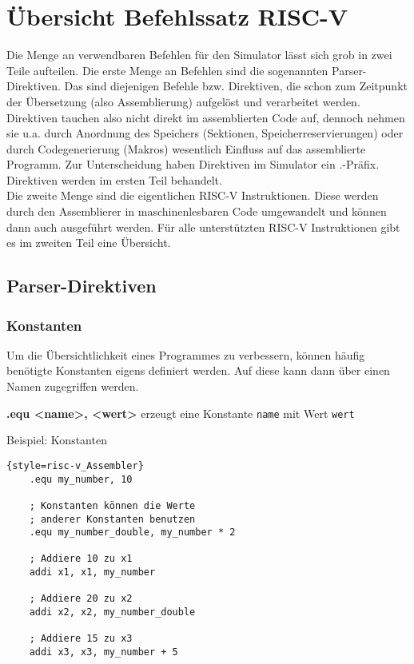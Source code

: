 
\section{Übersicht Befehlssatz RISC-V}
Die Menge an verwendbaren Befehlen für den Simulator lässt sich grob in zwei Teile aufteilen. Die erste Menge an Befehlen sind die sogenannten Parser-Direktiven. Das sind diejenigen Befehle bzw. Direktiven, die schon zum Zeitpunkt der Übersetzung (also Assemblierung) aufgelöst und verarbeitet werden. Direktiven tauchen also nicht direkt im assemblierten Code auf, dennoch nehmen sie u.a. durch Anordnung des Speichers (Sektionen, Speicherreservierungen) oder durch Codegenerierung (Makros) wesentlich Einfluss auf das assemblierte Programm. Zur Unterscheidung haben Direktiven im Simulator ein .-Präfix. Direktiven werden im ersten Teil behandelt.\\
Die zweite Menge sind die eigentlichen RISC-V Instruktionen. Diese werden durch den Assemblierer in maschinenlesbaren Code umgewandelt und können dann auch ausgeführt werden. Für alle unterstützten RISC-V Instruktionen gibt es im zweiten Teil eine Übersicht.

\subsection{Parser-Direktiven}

\subsubsection{Konstanten}
Um die Übersichtlichkeit eines Programmes zu verbessern, können häufig benötigte
Konstanten eigens definiert werden. Auf diese kann dann über einen Namen
zugegriffen werden.

\textbf{.equ <name>, <wert>} erzeugt eine Konstante \texttt{name} mit Wert \texttt{wert}

\begin{exampleblock}{Beispiel: Konstanten}
	\begin{lstlisting}{style=risc-v_Assembler}
	.equ my_number, 10
	
	; Konstanten können die Werte
	; anderer Konstanten benutzen
	.equ my_number_double, my_number * 2
	
	; Addiere 10 zu x1
	addi x1, x1, my_number
	
	; Addiere 20 zu x2
	addi x2, x2, my_number_double
	
	; Addiere 15 zu x3
	addi x3, x3, my_number + 5
	\end{lstlisting}
\end{exampleblock}

